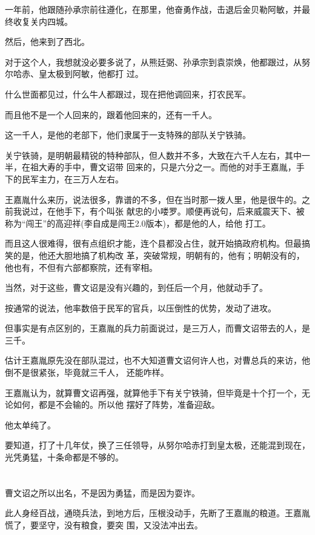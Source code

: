 \documentclass[11pt,a4paper,onecolumn]{article}
\begin{document}
一年前，他跟随孙承宗前往遵化，在那里，他奋勇作战，击退后金贝勒阿敏，并最终收复关内四城。

然后，他来到了西北。

对于这个人，我想就没必要多说了，从熊廷弼、孙承宗到袁崇焕，他都跟过，从努尔哈赤、皇太极到阿敏，他都打
过。

什么世面都见过，什么牛人都跟过，现在把他调回来，打农民军。

而且他不是一个人回来的，跟着他回来的，还有一千人。

这一千人，是他的老部下，他们隶属于一支特殊的部队\myrule 关宁铁骑。

关宁铁骑，是明朝最精锐的特种部队，但人数并不多，大致在六千人左右，其中一半，在祖大寿的手中，曹文诏带
回来的，只是六分之一。而他的对手王嘉胤，手下的民军主力，在三万人左右。

王嘉胤什么来历，说法很多，靠谱的不多，但在当时那一拨人里，他是很牛的。之前我说过，在他手下，有个叫张
献忠的小喽罗。顺便再说句，后来威震天下、被称为``闯王''的高迎祥(李自成是闯王2.0版本)，都是他的人，给他
打工。

而且这人很难得，很有点组织才能，连个县都没占住，就开始搞政府机构。但最搞笑的是，他还大胆地搞了机构改
革，突破常规，明朝有的，他有；明朝没有的，他也有，不但有六部都察院，还有宰相。

当然，对于这些，曹文诏是没有兴趣的，到任后一个月，他就动手了。

按通常的说法，他率数倍于民军的官兵，以压倒性的优势，发动了进攻。

但事实是有点区别的，王嘉胤的兵力前面说过，是三万人，而曹文诏带去的人，是三千。

估计王嘉胤原先没在部队混过，也不大知道曹文诏何许人也，对曹总兵的来访，他倒不是很紧张，毕竟就三千人，
还能咋样。

王嘉胤认为，就算曹文诏再强，就算他手下有关宁铁骑，但毕竟是十个打一个，无论如何，都是不会输的。所以他
摆好了阵势，准备迎敌。

他太单纯了。

要知道，打了十几年仗，换了三任领导，从努尔哈赤打到皇太极，还能混到现在，光凭勇猛，十条命都是不够的。

\section[\thesection]{}

曹文诏之所以出名，不是因为勇猛，而是因为耍诈。

此人身经百战，通晓兵法，到地方后，压根没动手，先断了王嘉胤的粮道。王嘉胤慌了，要坚守，没有粮食，要突
围，又没法冲出去。
\end{document}
